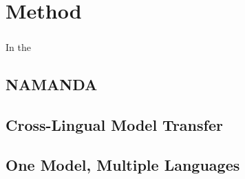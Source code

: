 \chapter{Method}
\label{chpt:5}

\paragraph{}
In the 

\section{NAMANDA}
\section{Cross-Lingual Model Transfer}


\section{One Model, Multiple Languages}
